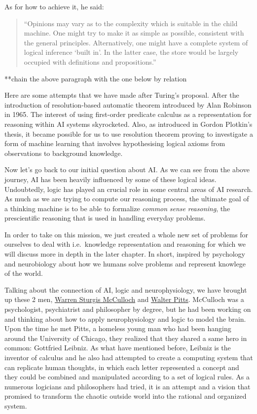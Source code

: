 \documentclass[]{book}
\theoremstyle{definition}
\theoremstyle{definition}
\theoremstyle{definition}
\theoremstyle{remark}
\begin{document}
As for how to achieve it, he said:

\begin{quote}
``Opinions may vary as to the complexity which is suitable in the child
machine. One might try to make it as simple as possible, consistent with
the general principles. Alternatively, one might have a complete system
of logical inference `built in'. In the latter case, the store would be
largely occupied with definitions and propositions.''
\end{quote}

**chain the above paragraph with the one below by relation

Here are some attempts that we have made after Turing's proposal. After
the introduction of resolution-based automatic theorem introduced by
Alan Robinson in 1965. The interest of using first-order predicate
calculus as a representation for reasoning within AI systems
skyrocketed. Also, as introduced in Gordon Plotkin's thesis, it became
possible for us to use resolution theorem proving to investigate a form
of machine learning that involves hypothesising logical axioms from
observations to background knowledge.

Now let's go back to our initial question about AI. As we can see from
the above journey, AI has been heavily influenced by some of these
logical ideas. Undoubtedly, logic has played an crucial role in some
central areas of AI research. As much as we are trying to compute our
reasoning process, the ultimate goal of a thinking machine is to be able
to formalize \emph{common} \emph{sense} \emph{reasoning}, the
prescientific reasoning that is used in handling everyday problems.

In order to take on this mission, we just created a whole new set of
problems for ourselves to deal with i.e.~knowledge representation and
reasoning for which we will discuss more in depth in the later chapter.
In short, inspired by psychology and neurobiology about how we humans
solve problems and represent knowlege of the world.

Talking about the connection of AI, logic and neurophysiology, we have
brought up these 2 men,
\href{https://en.wikipedia.org/wiki/Warren_Sturgis_McCulloch}{Warren
Sturgis McCulloch} and
\href{https://en.wikipedia.org/wiki/Walter_Pitts}{Walter Pitts}.
McCulloch was a psychologist, psychiatrist and philosopher by degree,
but he had been working on and thinking about how to apply
neurophysiology and logic to model the brain. Upon the time he met
Pitts, a homeless young man who had been hanging around the University
of Chicago, they realized that they shared a same hero in common:
Gottfried Leibniz. As what have mentioned before, Leibniz is the
inventor of calculus and he also had attempted to create a computing
system that can replicate human thoughts, in which each letter
represented a concept and they could be combined and manipulated
according to a set of logical rules. As a numerous logicians and
philosophers had tried, it is an attempt and a vision that promised to
transform the chaotic outside world into the rational and organized
system.
\end{document}
